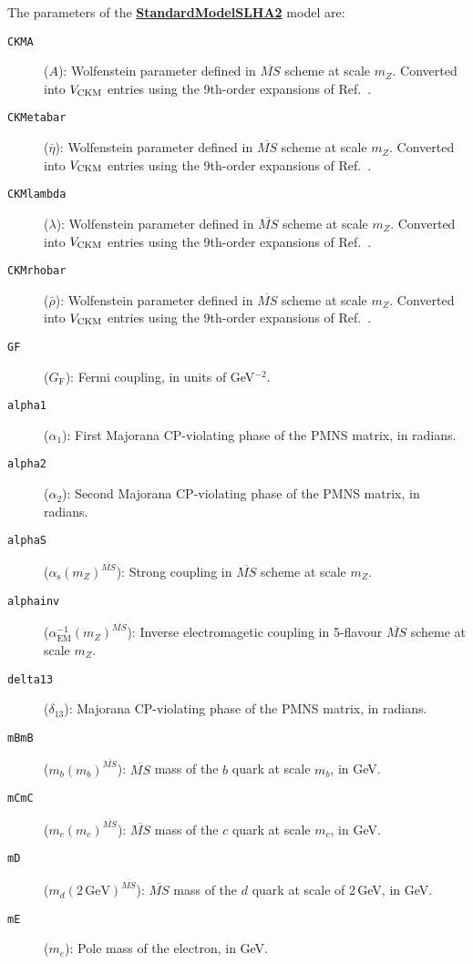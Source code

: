 \documentclass[pdftex,twocolumn,epjc3_preprint,runningheads]{svjour3}
\renewcommand{\_}{\discretionary{\underscore}{}{\underscore}}
\newcommand{\doublecrosssf}[2]{\hyperref[#2]{\textbf{\textsf{#1}}}}
\newcommand{\MSbar}{$\MSBar$\xspace}
\newcommand{\MSBar}{\overline{MS}}
\begin{document}
The parameters of the \doublecrosssf{StandardModel\_SLHA2}{SM_SLHA2} model are:
\begin{description}
\item[{\footnotesize\tt CKM\_A}]($A$): Wolfenstein parameter defined in \MSbar scheme at scale $m_Z$. Converted into $V_{\rm CKM}$ entries using the 9th-order expansions of Ref.\ \cite{CKMFitter}.
\item[{\footnotesize\tt CKM\_etabar}]($\bar{\eta}$): Wolfenstein parameter defined in \MSbar scheme at scale $m_Z$. Converted into $V_{\rm CKM}$ entries using the 9th-order expansions of Ref.\ \cite{CKMFitter}.
\item[{\footnotesize\tt CKM\_lambda}]($\lambda$): Wolfenstein parameter defined in \MSbar scheme at scale $m_Z$. Converted into $V_{\rm CKM}$ entries using the 9th-order expansions of Ref.\ \cite{CKMFitter}.
\item[{\footnotesize\tt CKM\_rhobar}]($\bar{\rho}$): Wolfenstein parameter defined in \MSbar scheme at scale $m_Z$. Converted into $V_{\rm CKM}$ entries using the 9th-order expansions of Ref.\ \cite{CKMFitter}.
\item[{\footnotesize\tt GF}]($G_\mathrm{F}$):  Fermi coupling, in units of GeV$^{-2}$.
\item[{\footnotesize\tt alpha1}]($\alpha_1$):  First Majorana CP-violating phase of the PMNS matrix, in radians.
\item[{\footnotesize\tt alpha2}]($\alpha_2$):  Second Majorana CP-violating phase of the PMNS matrix, in radians.
\item[{\footnotesize\tt alphaS}]($\alpha_\mathrm{s}(m_Z)^{\MSBar}$):  Strong coupling in \MSbar scheme at scale $m_Z$.
\item[{\footnotesize\tt alphainv}]($\alpha^{-1}_{\mathrm{EM}}(m_Z)^{\MSBar}$):  Inverse electromagetic coupling in 5-flavour \MSbar scheme at scale $m_Z$.
\item[{\footnotesize\tt delta13}]($\delta_{13}$):  Majorana CP-violating phase of the PMNS matrix, in radians.
\item[{\footnotesize\tt mBmB}]($m_b(m_b)^{\MSBar}$): \MSbar mass of the $b$ quark at scale $m_b$, in GeV.
\item[{\footnotesize\tt mCmC}]($m_c(m_c)^{\MSBar}$): \MSbar mass of the $c$ quark at scale $m_c$, in GeV.
\item[{\footnotesize\tt mD}]($m_d(2\,\mathrm{GeV})^{\MSBar}$): \MSbar mass of the $d$ quark at scale of 2\,GeV, in GeV.
\item[{\footnotesize\tt mE}]($m_e$):  Pole mass of the electron, in GeV.

\end{description}
\end{document}
